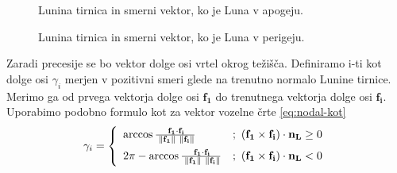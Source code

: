 \documentclass[a4paper,12pt]{article}
\renewcommand{\vec}[1]{\mathbf{#1}} %
\begin{document}
\begin{figure}[h!]
    \centering
    \begin{minipage}[t]{.5\textwidth}
        \centering
        \begin{minipage}{0.8\textwidth}
            \caption{Lunina tirnica in smerni vektor, ko je Luna v apogeju.}
        \end{minipage}%
    \end{minipage}%
    \hfill
    \begin{minipage}[t]{.5\textwidth}
        \centering
        \begin{minipage}{0.8\textwidth}
            \caption{Lunina tirnica in smerni vektor, ko je Luna v perigeju.}
        \end{minipage}
    \end{minipage}
\end{figure}

\noindent
Zaradi precesije se bo vektor dolge osi vrtel okrog težišča. Definiramo i-ti 
kot dolge osi $\gamma_i$ merjen v pozitivni smeri glede na trenutno normalo 
Lunine tirnice. Merimo ga od prvega vektorja dolge osi $\vec{f_1}$ do 
trenutnega vektorja dolge osi $\vec{f_i}$. Uporabimo podobno formulo kot za 
vektor vozelne črte \eqref{eq:nodal-kot}
\begin{equation*}
    \gamma_i = \left\{
        \begin{array}{ll}
            \arccos{\frac{\: \vec{f_1} \cdot \vec{f_i}}
            {\; \norm{\vec{f_1}} \ \norm{\vec{f_i}}}} & 
            {;\ (\vec{f_1}\times\vec{f_i})\cdot\vec{n_L} \geq 0} \vspace{0.5em} \\
            2\pi - \arccos{\frac{\: \vec{f_1} \cdot \vec{f_i}}
            {\; \norm{\vec{f_1}} \ \norm{\vec{f_i}}}} & 
            {;\ (\vec{f_1}\times\vec{f_i})\cdot\vec{n_L} < 0}
        \end{array}
    \right.
\end{equation*}
\end{document}
